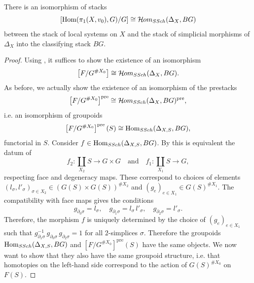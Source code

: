 \begin{thm} \label{thm: stack of local systems as stack of simplicial maps}
There is an isomorphism of stacks
\begin{equation}
\left[ \text{Hom}(\pi_1(X, v_0), G) / G \right] \cong \mathcal{H}\kern -.5pt om_{SSch}(\Delta_X, BG)
\end{equation}
between the stack of local systems on $X$ and the stack of simplicial morphisms of $\Delta_X$ into the classifying stack $BG$.
\end{thm}
\begin{proof}
Using , it suffices to show the existence of an isomorphism
\begin{equation}
\left[ F / G^{\# X_0} \right] \cong \mathcal{H}\kern -.5pt om_{SSch}(\Delta_X, BG).
\end{equation}
As before, we actually show the existence of an isomorphism of the prestacks
\begin{equation}
\left[ F / G^{\# X_0} \right]^{\text{pre}} \cong \mathcal{H}\kern -.5pt om_{SSch}(\Delta_X, BG)^{\text{pre}},
\end{equation}
i.e. an isomorphism of groupoids
\begin{equation}
\left[ F / G^{\# X_0} \right]^{\text{pre}}(S) \cong \operatorname{Hom}_{SSch}(\Delta_{X, S}, BG),
\end{equation}
functorial in $S$. Consider $f \in \operatorname{Hom}_{SSch}(\Delta_{X, S}, BG)$. By  this is equivalent the datum of
\begin{equation}
f_2 \colon \coprod_{X_2} S \to G \times G \quad \text{and} \quad f_1 \colon \coprod_{X_1} S \to G,
\end{equation}
respecting face and degeneracy maps. These correspond to choices of elements $(l_{\sigma}, l'_{\sigma})_{\sigma \in X_2} \in (G(S) \times G(S))^{\# X_2}$ and $(g_e)_{e \in X_1} \in G(S)^{\# X_1}$. The compatibility with face maps gives the conditions
\begin{equation}
g_{\partial_0 \sigma} = l_{\sigma}, \quad g_{\partial_1 \sigma} = l_{\sigma} \, l'_{\sigma}, \quad g_{\partial_2 \sigma} = l'_{\sigma}.
\end{equation}
Therefore, the morphism $f$ is uniquely determined by the choice of $(g_e)_{e \in X_1}$ such that $g_{\partial_1 \sigma}^{-1} \, g_{\partial_0 \sigma} \, g_{\partial_2 \sigma}  = 1$ for all $2$-simplices $\sigma$. Therefore the groupoids $\operatorname{Hom}_{SSch}(\Delta_{X, S}, BG)$ and $\left[ F / G^{\# X_0} \right]^{\text{pre}}(S)$ have the same objects. We now want to show that they also have the same groupoid structure, i.e. that homotopies on the left-hand side correspond to the action of $G(S)^{\# X_0}$ on $F(S)$.

\end{proof}
